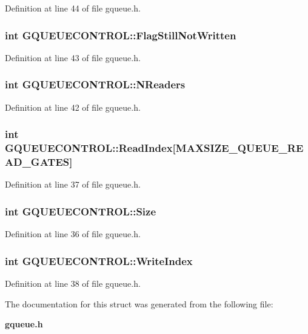 Definition at line 44 of file gqueue.h.
\subsubsection[{FlagStillNotWritten}]{\setlength{\rightskip}{0pt plus 5cm}int {\bf GQUEUECONTROL::FlagStillNotWritten}}\label{structGQUEUECONTROL_a4d58bdb6b0dc93bb6034c4209b6e7915}


Definition at line 43 of file gqueue.h.
\subsubsection[{NReaders}]{\setlength{\rightskip}{0pt plus 5cm}int {\bf GQUEUECONTROL::NReaders}}\label{structGQUEUECONTROL_a790618cf693d7e4249fec2f5074b40e3}


Definition at line 42 of file gqueue.h.
\subsubsection[{ReadIndex}]{\setlength{\rightskip}{0pt plus 5cm}int {\bf GQUEUECONTROL::ReadIndex}[MAXSIZE\_\-QUEUE\_\-READ\_\-GATES]}\label{structGQUEUECONTROL_aed43ab94887b0e203a23877fb26988b6}


Definition at line 37 of file gqueue.h.
\subsubsection[{Size}]{\setlength{\rightskip}{0pt plus 5cm}int {\bf GQUEUECONTROL::Size}}\label{structGQUEUECONTROL_a4db75bcca77dbc6ea7d8d5c3cd3a365f}


Definition at line 36 of file gqueue.h.
\subsubsection[{WriteIndex}]{\setlength{\rightskip}{0pt plus 5cm}int {\bf GQUEUECONTROL::WriteIndex}}\label{structGQUEUECONTROL_a614237a6b5ee3fca394e40a0274d5b43}


Definition at line 38 of file gqueue.h.

The documentation for this struct was generated from the following file:\begin{DoxyCompactItemize}
\item 
{\bf gqueue.h}\end{DoxyCompactItemize}
